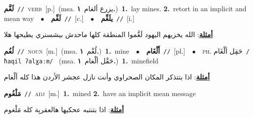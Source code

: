 \documentclass[10pt,a4paper,twoside]{article} %
\begin{document}
\begin{multicols}{2}
{\setlength\topsep{0pt}\textbf{\foreignlanguage{arabic}{لَغَّم}}\ {\color{gray}\texttt{//}\color{black}}\ \textsc{verb}\ [p.]\ \color{gray}(msa. \foreignlanguage{arabic}{يزرع ألغام}~\foreignlanguage{arabic}{\textbf{١.}})\color{black}\ \textbf{1.}~lay mines.  \textbf{2.}~retort in an implicit and mean way\ \ $\bullet$\ \ \setlength\topsep{0pt}\textbf{\foreignlanguage{arabic}{لَغِّم}}\ {\color{gray}\texttt{//}\color{black}}\ [c.]\ \ $\bullet$\ \ \setlength\topsep{0pt}\textbf{\foreignlanguage{arabic}{يلَغِّم}}\ {\color{gray}\texttt{//}\color{black}}\ [i.]\  \begin{flushright}\color{gray}\foreignlanguage{arabic}{\textbf{\underline{\foreignlanguage{arabic}{أمثلة}}}: الله يخزيهم اليهود لَغَّموا المنطقة كلها ماحدش بيشستري يطيحها هلا}\end{flushright}\color{black}} \vspace{2mm}

{\setlength\topsep{0pt}\textbf{\foreignlanguage{arabic}{لُغُم}}\ {\color{gray}\texttt{//}\color{black}}\ \textsc{noun}\ [m.]\ \color{gray}(msa. \foreignlanguage{arabic}{لُغْم}~\foreignlanguage{arabic}{\textbf{١.}})\color{black}\ \textbf{1.}~mine\ \ $\bullet$\ \ \setlength\topsep{0pt}\textbf{\foreignlanguage{arabic}{أَلْغَام}}\ {\color{gray}\texttt{//}\color{black}}\ [pl.]\ \ $\bullet$\ \ \textsc{ph.} \color{gray} \foreignlanguage{arabic}{حَقِل ألْغَام}\color{black}\ {\color{gray}\texttt{/{\sffamily ħaqil ʔalɣaːm}/}\color{black}}\ \color{gray} (msa. \foreignlanguage{arabic}{حَقْل ألْغام}~\foreignlanguage{arabic}{\textbf{١.}})\color{black}\ \textbf{1.}~minefield\  \begin{flushright}\color{gray}\foreignlanguage{arabic}{\textbf{\underline{\foreignlanguage{arabic}{أمثلة}}}: اذا بتتذكر المكان الصحراوي وأنت نازل عجشر الأردن هذا كله ألْغام}\end{flushright}\color{black}} \vspace{2mm}

{\setlength\topsep{0pt}\textbf{\foreignlanguage{arabic}{مَلْغُوم}}\ {\color{gray}\texttt{//}\color{black}}\ \textsc{adj}\ [m.]\ \textbf{1.}~mined  \textbf{2.}~have an implicit mean message\  \begin{flushright}\color{gray}\foreignlanguage{arabic}{\textbf{\underline{\foreignlanguage{arabic}{أمثلة}}}: اذا بتنتبه عحكيها هالعقربِة كله مَلْغوم}\end{flushright}\color{black}} \vspace{2mm}


\end{multicols}
\end{document}
